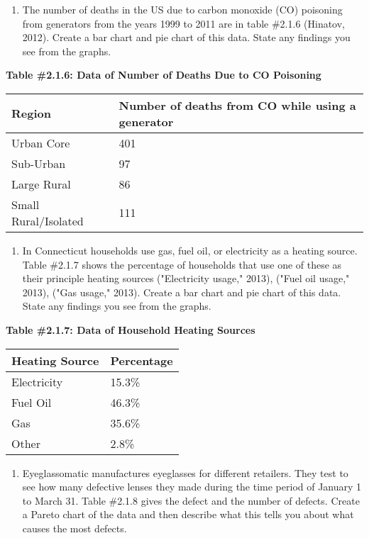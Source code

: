 \documentclass[]{book}
\providecommand{\tightlist}{%
  \setlength{\itemsep}{0pt}\setlength{\parskip}{0pt}}
\begin{document}
\begin{enumerate}
\def\labelenumi{\arabic{enumi}.}
\setcounter{enumi}{2}
\tightlist
\item
  The number of deaths in the US due to carbon monoxide (CO) poisoning
  from generators from the years 1999 to 2011 are in table \#2.1.6
  (Hinatov, 2012). Create a bar chart and pie chart of this data.
  State any findings you see from the graphs.
\end{enumerate}

\textbf{Table \#2.1.6: Data of Number of Deaths Due to CO Poisoning}

\begin{longtable}[]{@{}ll@{}}
\toprule
Region & Number of deaths from CO while using a generator\tabularnewline
\midrule
\endhead
Urban Core & 401\tabularnewline
Sub-Urban & 97\tabularnewline
Large Rural & 86\tabularnewline
Small Rural/Isolated & 111\tabularnewline
\bottomrule
\end{longtable}

\begin{enumerate}
\def\labelenumi{\arabic{enumi}.}
\setcounter{enumi}{3}
\tightlist
\item
  In Connecticut households use gas, fuel oil, or electricity as a
  heating source. Table \#2.1.7 shows the percentage of households
  that use one of these as their principle heating sources
  ("Electricity usage," 2013), ("Fuel oil usage," 2013), ("Gas
  usage," 2013). Create a bar chart and pie chart of this data. State
  any findings you see from the graphs.
\end{enumerate}

\textbf{Table \#2.1.7: Data of Household Heating Sources}

\begin{longtable}[]{@{}ll@{}}
\toprule
Heating Source & Percentage\tabularnewline
\midrule
\endhead
Electricity & 15.3\%\tabularnewline
Fuel Oil & 46.3\%\tabularnewline
Gas & 35.6\%\tabularnewline
Other & 2.8\%\tabularnewline
\bottomrule
\end{longtable}

\begin{enumerate}
\def\labelenumi{\arabic{enumi}.}
\setcounter{enumi}{4}
\tightlist
\item
  Eyeglassomatic manufactures eyeglasses for different retailers. They
  test to see how many defective lenses they made during the time
  period of January 1 to March 31. Table \#2.1.8 gives the defect and
  the number of defects. Create a Pareto chart of the data and then
  describe what this tells you about what causes the most defects.
\end{enumerate}
\end{document}
